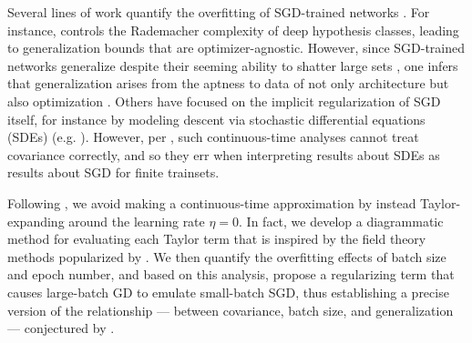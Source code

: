\documentclass{article}
\begin{document}

    Several lines of work quantify the overfitting of SGD-trained networks
    \citep{ne17a}.  For instance, \citet{ba17} controls the Rademacher
    complexity of deep hypothesis classes, leading to generalization bounds
    that are optimizer-agnostic.  However, since SGD-trained networks
    generalize despite their seeming ability to shatter large sets
    \citep{zh17}, one infers that generalization arises from the aptness to
    data of not only architecture but also optimization \citep{ne17b}.  Others
    have focused on the implicit regularization of SGD itself, for instance by
    modeling descent via stochastic differential equations (SDEs) (e.g.
    \citet{ch18}).  However, per \citet{ya19a}, such continuous-time analyses
    cannot treat covariance correctly, and so they err when interpreting
    results about SDEs as results about SGD for finite trainsets.


    Following
    \citet{ro18}, we avoid making a continuous-time
    approximation by instead Taylor-expanding around the learning rate
    $\eta=0$.  In fact, we develop a diagrammatic method for evaluating each
    Taylor term that is inspired by the field theory methods popularized by
    \citet{dy49a}.  We then quantify the overfitting effects
    of batch size and epoch number, and based on this analysis, propose a
    regularizing term that causes large-batch GD to emulate small-batch SGD,
    thus establishing a precise version of the relationship --- between
    covariance, batch size, and generalization --- conjectured by \citet{ja18}.  
    
\end{document}
